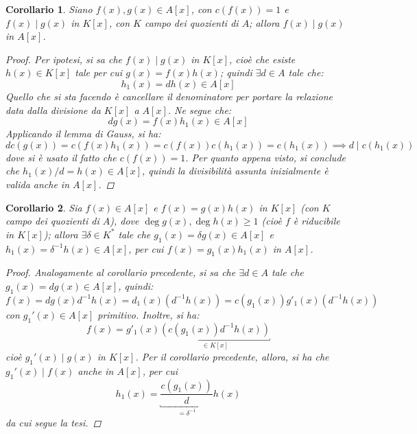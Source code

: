 \documentclass[12pt]{scrartcl}
\theoremstyle{style}
\newtheorem{corollario}{Corollario}[teorema]
\numberwithin{equation}{subsection}
\begin{document}
\begin{corollario}\label{corufd1}
	Siano $f(x),g(x) \in A[x]$, con $c(f(x)) =1 $ e $f(x)  \mid g(x)$ in $K[x]$, con $K$ campo dei quozienti di $A$; allora $f(x)  \mid g(x)$ in $A[x]$.
	\begin{proof}
		Per ipotesi, si sa che $f(x)  \mid g(x)$ in $K[x]$, cio\`e che esiste $h(x) \in K[x]$ tale per cui $g(x) = f(x) h(x)$; quindi $\exists d \in A$ tale che:
		\[
			h_1(x) = dh(x) \in A[x]
		\] 
		Quello che si sta facendo \`e cancellare il denominatore per portare la relazione data dalla divisione da $K[x]$ a $A[x]$.
		Ne segue che:
		\[
			dg(x) = f(x) h_1(x) \in A[x]
		\] 
		Applicando il lemma di Gauss, si ha:
		\[
		dc(g(x)) = c(f(x)h_1(x)) = c(f(x)) c(h_1(x)) = c(h_1(x)) \implies d  \mid c(h_1(x))
		\] 
		dove si \`e usato il fatto che $c(f(x)) = 1$. 
		Per quanto appena visto, si conclude che $h_1(x) / d = h(x) \in A[x]$, quindi la divisibilit\`a assunta inizialmente \`e valida anche in $A[x]$.
	\end{proof}
\end{corollario}
\begin{corollario}\label{corufd2}
	Sia $f(x) \in A[x]$ e $f(x) = g(x) h(x) $ in $K[x]$ (con $K$ campo dei quozienti di $A$), dove $\operatorname{deg} g(x) , \operatorname{deg} h(x) \ge 1$ (cio\`e $f$ \`e riducibile in $K[x]$); allora $\exists \delta \in K^*$ tale che $g_1(x) = \delta g(x) \in A[x]$ e $h_1(x) = \delta ^{-1}h(x)\in A[x]$, per cui $f(x) = g_1(x) h_1(x)$ in $A[x]$.
	\begin{proof}
		Analogamente al corollario precedente, si sa che $\exists d \in A$ tale che $g_1(x) = dg(x) \in A[x]$, quindi:
		\[
		f(x) = dg(x) d^{-1}h(x) = d_1(x) \left(d^{-1} h(x)\right) = c(g_1(x)) g'_1(x) (d^{-1}h(x))
		\] 
		con $g_1'(x) \in A[x] $ primitivo.
		Inoltre, si ha:
		\[
			f(x) = g'_1(x) \underbracket{\left(c(g_1(x)) d^{-1}h(x)\right) }_{\in K[x]} 
		\] 
		cio\`e $g_1'(x)  \mid g(x)$ in $K[x]$.
		Per il corollario precedente, allora, si ha che $g_1'(x)  \mid f(x)$ anche in $A[x]$, per cui 
		\[
			h_1(x) = \underbracket{\frac{c(g_1(x))}{d}}_{=\delta ^{-1}} h(x)
		\] 
		 da cui segue la tesi.
	\end{proof}
\end{corollario}
\end{document}
